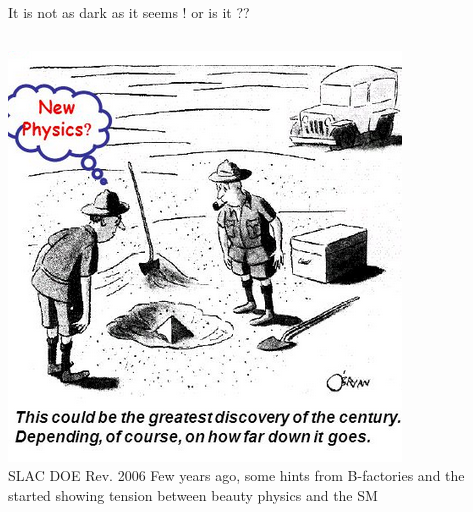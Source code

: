 \documentclass[9pt,usenames,dvipsnames]{beamer}
\begin{document}
\begin{frame}{It is not as dark as it seems ! {\small or is it ??}}
	\begin{columns}[c]
			\centering
			\includegraphics[width= \textwidth]{./assets/NP}\\{\tiny SLAC DOE Rev. 2006}
Few years ago, some hints from B-factories and the \LHCb started showing tension between beauty physics and the SM
	
	\end{columns}
\end{frame}
\end{document}
